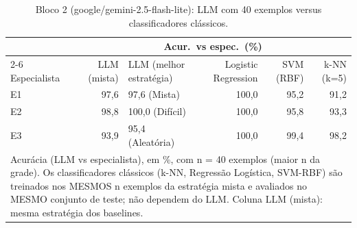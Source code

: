\begin{table}[htbp]
\centering
\small
\caption{Bloco 2 (google/gemini-2.5-flash-lite): LLM com 40 exemplos versus classificadores clássicos.}
\label{tab:bloco2_E_LLM_vs_baselines_nmax_flashlite}
\begin{tabular}{lrlrrr}
\toprule
 & \multicolumn{5}{c}{Acur.\ vs espec.\ (\%)} \\ \cmidrule(lr){2-6}
Especialista & LLM (mista) & LLM (melhor estratégia) & Logistic Regression & SVM (RBF) & k-NN (k=5) \\
\midrule
E1 & 97,6 & 97,6 (Mista) & 100,0 & 95,2 & 91,2 \\
E2 & 98,8 & 100,0 (Difícil) & 100,0 & 95,8 & 93,3 \\
E3 & 93,9 & 95,4 (Aleatória) & 100,0 & 99,4 & 98,2 \\
\bottomrule
\multicolumn{6}{p{0.95\linewidth}}{\footnotesize Acurácia (LLM vs especialista), em \%, com n = 40 exemplos (maior n da grade). Os classificadores clássicos (k-NN, Regressão Logística, SVM-RBF) são treinados nos MESMOS n exemplos da estratégia mista e avaliados no MESMO conjunto de teste; não dependem do LLM. Coluna LLM (mista): mesma estratégia dos baselines.} \\
\end{tabular}
\end{table}
